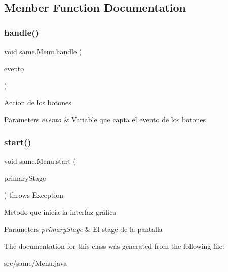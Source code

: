 \subsection{Member Function Documentation}
\mbox{\label{classsame_1_1_menu_a5c930cf789ca6c4eee4dd807f451f75a}} 
\subsubsection{\texorpdfstring{handle()}{handle()}}
{\footnotesize\ttfamily void same.\+Menu.\+handle (\begin{DoxyParamCaption}\item[{Action\+Event}]{evento }\end{DoxyParamCaption})}

Accion de los botones 
\begin{DoxyParams}{Parameters}
{\em evento} & Variable que capta el evento de los botones\\
\hline
\end{DoxyParams}
\mbox{\label{classsame_1_1_menu_a6fa1dc5d1236ff823c8f137c30f086de}} 
\subsubsection{\texorpdfstring{start()}{start()}}
{\footnotesize\ttfamily void same.\+Menu.\+start (\begin{DoxyParamCaption}\item[{Stage}]{primary\+Stage }\end{DoxyParamCaption}) throws Exception}

Metodo que inicia la interfaz gráfica 
\begin{DoxyParams}{Parameters}
{\em primary\+Stage} & El stage de la pantalla\\
\hline
\end{DoxyParams}


The documentation for this class was generated from the following file\+:\begin{DoxyCompactItemize}
\item 
src/same/Menu.\+java\end{DoxyCompactItemize}
